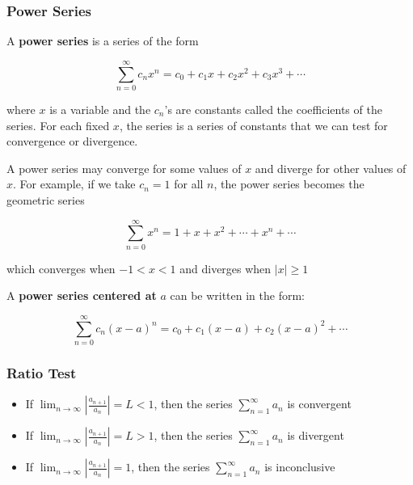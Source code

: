 \documentclass[t]{beamer}
\theoremstyle{plain}
\theoremstyle{definition}
\newcommand{\limm}[1]{\displaystyle \lim_{n\to #1}}
\begin{document}
\begin{frame}

\footnotesize

\frametitle{Power Series}

A \textbf{power series} is a series of the form

$$\sum_{n=0}^{\infty} c_nx^n = c_0 + c_1x + c_2x^2 + c_3x^3 + \cdots$$

where $x$ is a variable and the $c_n$'s are constants called the coefficients of the series.   For each fixed $x$, the series is a series of constants that we can test for convergence or divergence.

\medskip

A power series may converge for some values of $x$ and diverge for other values of $x$.  For example, if we take $c_n = 1$ for all $n$, the power series becomes the geometric series

$$\sum_{n=0}^{\infty}x^n = 1 + x + x^2 + \cdots + x^n + \cdots $$

which converges when $-1 < x < 1$ and diverges when $|x| \geq 1$

A \textbf{power series centered at} $a$ can be written in the form:

$$\sum_{n=0}^{\infty} c_n(x-a)^n = c_0 + c_1(x - a) + c_2 (x - a)^2 + \cdots$$

\end{frame}

\begin{frame}

\frametitle{Ratio Test}

\begin{itemize}
	\item If $\limm{\infty} \displaystyle\left|\frac{a_{n+1}}{a_n}\right| = L < 1$, then the series $\displaystyle\sum_{n=1}^{\infty} a_n$ is convergent
	\item If $\limm{\infty} \displaystyle\left|\frac{a_{n+1}}{a_n}\right| = L > 1$, then the series $\displaystyle\sum_{n=1}^{\infty} a_n$ is divergent
	\item If $\limm{\infty} \displaystyle\left|\frac{a_{n+1}}{a_n}\right| =  1$, then the series $\displaystyle\sum_{n=1}^{\infty} a_n$ is inconclusive
\end{itemize}


\end{frame}
\end{document}
